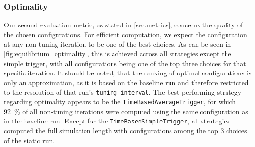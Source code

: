 \subsubsection{Optimality}
Our second evaluation metric, as stated in \autoref{sec:metrics}, concerns the quality of the chosen configurations. For efficient computation, we expect the configuration at any non-tuning iteration to be one of the best choices. As can be seen in \autoref{fig:equilibrium_optimality}, this is achieved across all strategies except the simple trigger, with all configurations being one of the top three choices for that specific iteration. It should be noted, that the ranking of optimal configurations is only an approximation, as it is based on the baseline run and therefore restricted to the resolution of that run's \texttt{tuning-interval}. The best performing strategy regarding optimality appears to be  the  \texttt{TimeBasedAverageTrigger}, for which \qty{92}{\percent} of all non-tuning iterations were computed using the same configuration as in the baseline run. Except for the \texttt{TimeBasedSimpleTrigger}, all strategies computed the full simulation length with configurations among the top 3 choices of the static run.

